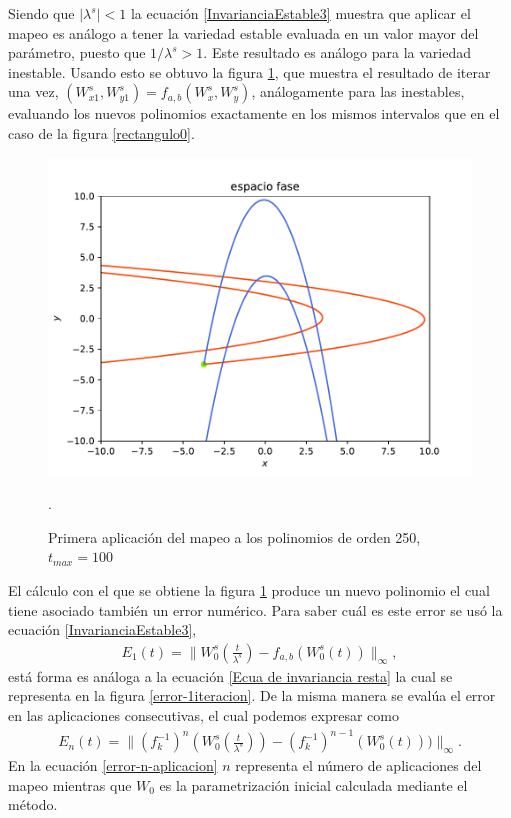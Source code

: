 Siendo que $\vert \lambda^{s} \vert < 1 $ la ecuación \eqref{InvarianciaEstable3} muestra que aplicar el mapeo es análogo a tener la variedad estable evaluada en un valor mayor del parámetro, puesto que $1/\lambda^{s}>1$. Este resultado es análogo para la variedad inestable. Usando esto se obtuvo la figura \ref{Rectangulo1}, que muestra el resultado de iterar una vez, $(W_{x1}^{s},W_{y1}^{s})=f_{a,b}(W_{x}^{s},W_{y}^{s})$, análogamente para las inestables, evaluando los nuevos polinomios exactamente en los mismos intervalos que en el caso de la figura \ref{rectangulo0}.
\begin{figure}[H]
\centering
\includegraphics[scale=0.5]{rectangulo1}
\caption{Primera aplicación del mapeo a los polinomios de orden 250, $t_{max}=100$}.
\label{Rectangulo1}
\end{figure}
El cálculo con el que se obtiene la figura \ref{Rectangulo1} produce un nuevo polinomio el cual tiene asociado también un error numérico. Para saber cuál es este error se usó la ecuación \eqref{InvarianciaEstable3},
\begin{eqnarray}
E_{1}(t)=\parallel W_{0}^{s}(\frac{t}{\lambda^{s}})-f_{a,b}(W_{0}^{s}(t))\parallel_{\infty},
\label{error-1aplicacion}
\end{eqnarray}
está forma es análoga a la ecuación \eqref{Ecua de invariancia resta} la cual se representa en la figura \ref{error-1iteracion}. De la misma manera se evalúa el error en las aplicaciones consecutivas, el cual podemos expresar como
\begin{eqnarray}
E_{n}(t)=\parallel (f^{-1}_{k})^{n}(W_{0}^{s}(\frac{t}{\lambda^{s}}))- (f^{-1}_{k})^{n-1}(W_{0}^{s}(t)))\parallel_{\infty}.
\label{error-n-aplicacion}
\end{eqnarray}
En la ecuación \eqref{error-n-aplicacion} $n$ representa el número de aplicaciones del mapeo mientras que $W_{0}$ es la parametrización inicial calculada mediante el método.

